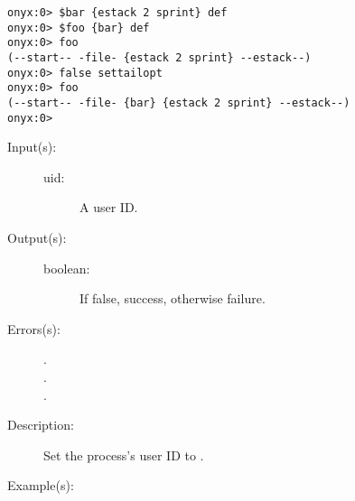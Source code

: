 \begin{description}
\begin{description}
\begin{verbatim}
onyx:0> $bar {estack 2 sprint} def
onyx:0> $foo {bar} def
onyx:0> foo
(--start-- -file- {estack 2 sprint} --estack--)
onyx:0> false settailopt
onyx:0> foo
(--start-- -file- {bar} {estack 2 sprint} --estack--)
onyx:0>
		\end{verbatim}
	\end{description}
\label{systemdict:setuid}
\item[{\onyxop{uid}{setuid}{boolean}}: ]
	\begin{description}\item[]
	\item[Input(s): ]
		\begin{description}\item[]
		\item[uid: ]
			A user ID.
		\end{description}
	\item[Output(s): ]
		\begin{description}\item[]
		\item[boolean: ]
			If false, success, otherwise failure.
		\end{description}
	\item[Errors(s): ]
		\begin{description}\item[]
		\item[.]
		\item[.]
		\item[.]
		\end{description}
	\item[Description: ]
		Set the process's user ID to .
	\item[Example(s): ]\begin{verbatim}


\end{verbatim}
\end{description}
\end{description}
